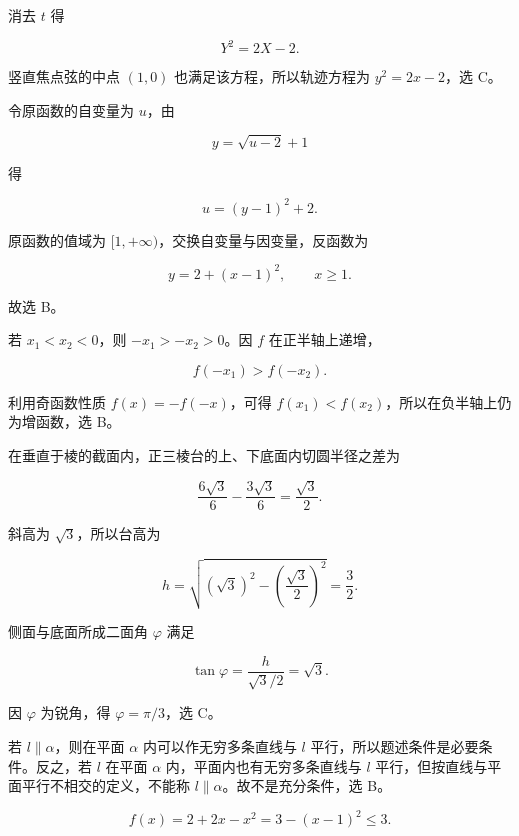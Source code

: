 \begin{answer}
消去 $t$ 得

\nopagebreak[4]
\[
Y^2=2X-2.
\]

竖直焦点弦的中点 $(1,0)$ 也满足该方程，所以轨迹方程为 $y^2=2x-2$，选 C。


令原函数的自变量为 $u$，由

\nopagebreak[4]
\[
y=\sqrt{u-2}+1
\]

得

\nopagebreak[4]
\[
u=(y-1)^2+2.
\]

原函数的值域为 $[1,+\infty)$，交换自变量与因变量，反函数为

\nopagebreak[4]
\[
y=2+(x-1)^2,\qquad x\ge1.
\]

故选 B。


若 $x_1<x_2<0$，则 $-x_1>-x_2>0$。因 $f$ 在正半轴上递增，

\nopagebreak[4]
\[
f(-x_1)>f(-x_2).
\]

利用奇函数性质 $f(x)=-f(-x)$，可得 $f(x_1)<f(x_2)$，所以在负半轴上仍为增函数，选 B。


在垂直于棱的截面内，正三棱台的上、下底面内切圆半径之差为

\nopagebreak[4]
\[
\frac{6\sqrt3}{6}-\frac{3\sqrt3}{6}=\frac{\sqrt3}{2}.
\]

斜高为 $\sqrt3$，所以台高为

\nopagebreak[4]
\[
h=\sqrt{(\sqrt3)^2-\left(\frac{\sqrt3}{2}\right)^2}=\frac32.
\]

侧面与底面所成二面角 $\varphi$ 满足

\nopagebreak[4]
\[
\tan\varphi=\frac{h}{\sqrt3/2}=\sqrt3.
\]

因 $\varphi$ 为锐角，得 $\varphi=\pi/3$，选 C。


若 $l\parallel\alpha$，则在平面 $\alpha$ 内可以作无穷多条直线与 $l$ 平行，所以题述条件是必要条件。反之，若 $l$ 在平面 $\alpha$ 内，平面内也有无穷多条直线与 $l$ 平行，但按直线与平面平行不相交的定义，不能称 $l\parallel\alpha$。故不是充分条件，选 B。


\nopagebreak[4]
\[
f(x)=2+2x-x^2=3-(x-1)^2\le3.
\]


\end{answer}
